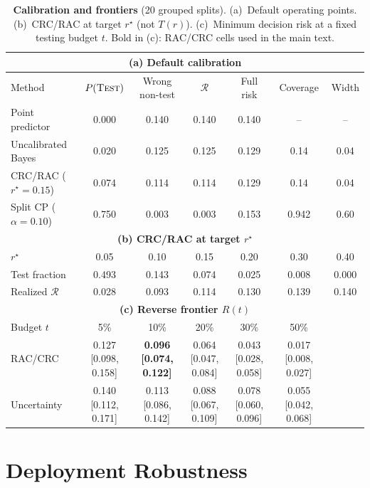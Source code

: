 \documentclass{article}
\newcommand{\test}{\textsc{Test}}
\newcommand{\risk}{\mathcal{R}}
\begin{document}
\begin{table}[h]
\centering
\caption{\textbf{Calibration and frontiers} (20 grouped splits).
(a)~Default operating points.
(b)~CRC/RAC at target $r^\star$ (not $T(r)$).
(c)~Minimum decision risk at a fixed testing budget $t$.
Bold in (c): RAC/CRC cells used in the main text.}
\label{tab:app_frontiers}
\small
\begin{tabular}{lcccccc}
\toprule
\multicolumn{7}{c}{\textbf{(a) Default calibration}}\\
\midrule
Method & $P(\test)$ & Wrong non-test & $\risk$ & Full risk & Coverage & Width\\
\midrule
Point predictor & 0.000 & 0.140 & 0.140 & 0.140 & -- & --\\
Uncalibrated Bayes & 0.020 & 0.125 & 0.125 & 0.129 & 0.14 & 0.04\\
CRC/RAC ($r^\star=0.15$) & 0.074 & 0.114 & 0.114 & 0.129 & 0.14 & 0.04\\
Split CP ($\alpha=0.10$) & 0.750 & 0.003 & 0.003 & 0.153 & 0.942 & 0.60\\
\midrule
\multicolumn{7}{c}{\textbf{(b) CRC/RAC at target $r^\star$}}\\
\midrule
$r^\star$ & 0.05 & 0.10 & 0.15 & 0.20 & 0.30 & 0.40\\
Test fraction & 0.493 & 0.143 & 0.074 & 0.025 & 0.008 & 0.000\\
Realized $\risk$ & 0.028 & 0.093 & 0.114 & 0.130 & 0.139 & 0.140\\
\midrule
\multicolumn{7}{c}{\textbf{(c) Reverse frontier $R(t)$}}\\
\midrule
Budget $t$ & 5\% & 10\% & 20\% & 30\% & 50\% & \\
RAC/CRC & 0.127 [0.098, 0.158] & \textbf{0.096 [0.074, 0.122]} &
0.064 [0.047, 0.084] & 0.043 [0.028, 0.058] & 0.017 [0.008, 0.027] & \\
Uncertainty & 0.140 [0.112, 0.171] & 0.113 [0.086, 0.142] &
0.088 [0.067, 0.109] & 0.078 [0.060, 0.096] & 0.055 [0.042, 0.068] & \\
\bottomrule
\end{tabular}
\end{table}

\section{Deployment Robustness}
\label{app:robustness}
\end{document}
